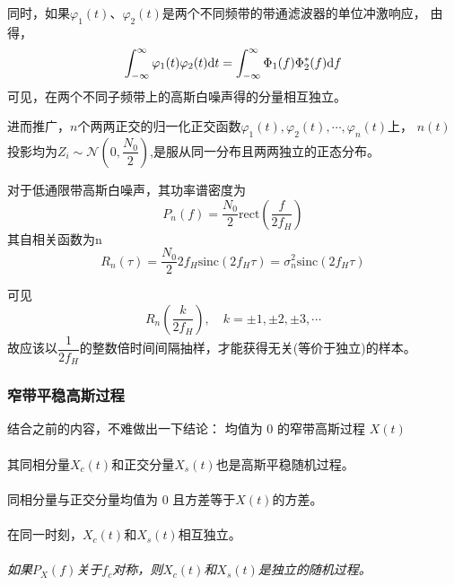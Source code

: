     同时，如果$\varphi_1(t)$、$\varphi_2(t)$是两个不同频带的带通滤波器的单位冲激响应，
    由得，
    \begin{equation}
        \int_{-\infty}^{\infty}\varphi_1(t)\varphi_2(t)\text{\upshape d} t=\int_{-\infty}^{\infty}\Phi_1(f)\Phi_2^*(f)\text{\upshape d} f
    \end{equation}
    可见，在两个不同子频带上的高斯白噪声得的分量相互独立。

    进而推广，$n$个两两正交的归一化正交函数$\varphi_1(t),\varphi_2(t),\cdots,\varphi_n(t)$上，
    $n(t)$投影均为$Z_i\sim\mathscr{N}(0,\dfrac{N_0}{2})$,是服从同一分布且两两独立的正态分布。

    对于低通限带高斯白噪声，其功率谱密度为
    \begin{equation}
        P_n(f)=\frac{N_0}{2}\text{rect}\left(\frac{f}{2f_H}\right)
    \end{equation}
    其自相关函数为n
    \begin{equation}
        R_n(\tau)=\frac{N_0}{2}2f_H\text{sinc}(2f_H\tau)=\sigma_n^2\text{sinc}(2f_H\tau)
    \end{equation}

    可见
    \begin{equation}
        R_n\left(\frac{k}{2f_H}\right),\hspace{1em}k=\pm 1,\pm 2,\pm 3,\cdots
    \end{equation}
    故应该以$\dfrac{1}{2f_H}$的整数倍时间间隔抽样，才能获得无关(等价于独立)的样本。

    \subsubsection{窄带平稳高斯过程}
    
    结合之前的内容，不难做出一下\emph{}{结论}：
    均值为 0 的窄带高斯过程 $X(t)$
    \paragraph{}其同相分量$X_c(t)$和正交分量$X_s(t)$也是高斯平稳随机过程。
    \paragraph{}同相分量与正交分量均值为 0 且方差等于$X(t)$的方差。
    \paragraph{}在同一时刻，$X_c(t)$和$X_s(t)$相互独立。
    \paragraph{}\emph{如果$P_X(f)$关于$f_c$对称，则$X_c(t)$和$X_s(t)$是独立的随机过程。}
    \vspace{2ex}

